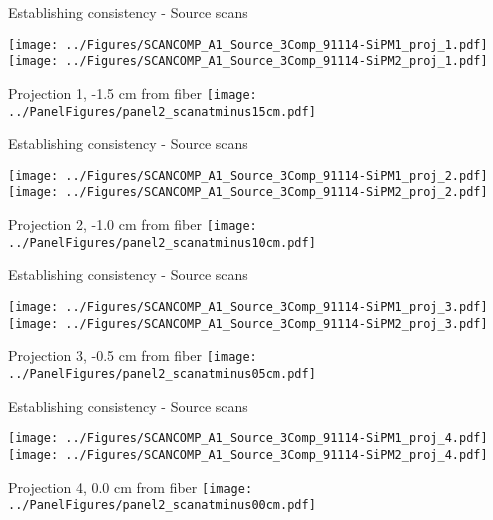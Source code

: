 \documentclass[compress,8pt]{beamer} %
\begin{document}
\begin{frame}{Establishing consistency - Source scans}
\begin{adjustwidth}{-2em}{-2em}
\texttt{[image: ../Figures/SCANCOMP\_A1\_Source\_3Comp\_91114-SiPM1\_proj\_1.pdf]}
\texttt{[image: ../Figures/SCANCOMP\_A1\_Source\_3Comp\_91114-SiPM2\_proj\_1.pdf]}
\end{adjustwidth}
Projection 1, -1.5 cm from fiber
\hfill \texttt{[image: ../PanelFigures/panel2\_scanatminus15cm.pdf]}
\end{frame}

\begin{frame}{Establishing consistency - Source scans}
\begin{adjustwidth}{-2em}{-2em}
\texttt{[image: ../Figures/SCANCOMP\_A1\_Source\_3Comp\_91114-SiPM1\_proj\_2.pdf]}
\texttt{[image: ../Figures/SCANCOMP\_A1\_Source\_3Comp\_91114-SiPM2\_proj\_2.pdf]}
\end{adjustwidth}
Projection 2, -1.0 cm from fiber
\hfill \texttt{[image: ../PanelFigures/panel2\_scanatminus10cm.pdf]}
\end{frame}

\begin{frame}{Establishing consistency - Source scans}
\begin{adjustwidth}{-2em}{-2em}
\texttt{[image: ../Figures/SCANCOMP\_A1\_Source\_3Comp\_91114-SiPM1\_proj\_3.pdf]}
\texttt{[image: ../Figures/SCANCOMP\_A1\_Source\_3Comp\_91114-SiPM2\_proj\_3.pdf]}
\end{adjustwidth}
Projection 3, -0.5 cm from fiber
\hfill \texttt{[image: ../PanelFigures/panel2\_scanatminus05cm.pdf]}
\end{frame}

\begin{frame}{Establishing consistency - Source scans}
\begin{adjustwidth}{-2em}{-2em}
\texttt{[image: ../Figures/SCANCOMP\_A1\_Source\_3Comp\_91114-SiPM1\_proj\_4.pdf]}
\texttt{[image: ../Figures/SCANCOMP\_A1\_Source\_3Comp\_91114-SiPM2\_proj\_4.pdf]}
\end{adjustwidth}
Projection 4, 0.0 cm from fiber
\hfill \texttt{[image: ../PanelFigures/panel2\_scanatminus00cm.pdf]}
\end{frame}
\end{document}
